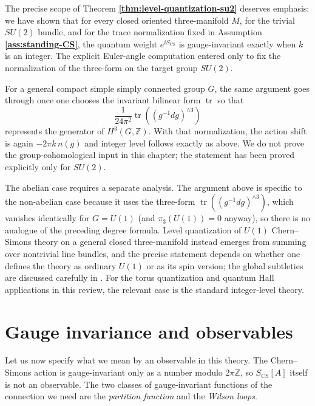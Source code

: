 \documentclass[11pt]{article}
\newcommand{\Z}{\mathbb{Z}}
\newcommand{\tr}{\operatorname{tr}}
\newcommand{\CS}{\operatorname{CS}}
\theoremstyle{definition}
\numberwithin{theorem}{section}
\numberwithin{equation}{section}
\begin{document}
\noindent The precise scope of Theorem \textbf{\ref{thm:level-quantization-su2}} deserves emphasis: we have shown that for every closed oriented three-manifold $M$, for the trivial $SU(2)$ bundle, and for the trace normalization fixed in Assumption \textbf{\ref{ass:standing-CS}}, the quantum weight $e^{iS_{\CS}}$ is gauge-invariant exactly when $k$ is an integer. The explicit Euler-angle computation entered only to fix the normalization of the three-form on the target group $SU(2)$.

\medskip

\noindent For a general compact simple simply connected group $G$, the same argument goes through once one chooses the invariant bilinear form $\tr$ so that
\begin{equation*}
\frac{1}{24\pi^2}\tr\left((g^{-1}dg)^{\wedge 3}\right)
\end{equation*}
represents the generator of $H^3(G,\Z)$. With that normalization, the action shift is again $-2\pi k\, n(g)$ and integer level follows exactly as above. We do not prove the group-cohomological input in this chapter; the statement has been proved explicitly only for $SU(2)$.

\medskip

\noindent The abelian case requires a separate analysis. The argument above is specific to the non-abelian case because it uses the three-form $\tr((g^{-1}dg)^{\wedge 3})$, which vanishes identically for $G=U(1)$ (and $\pi_3(U(1))=0$ anyway), so there is no analogue of the preceding degree formula. Level quantization of $U(1)$ Chern--Simons theory on a general closed three-manifold instead emerges from summing over nontrivial line bundles, and the precise statement depends on whether one defines the theory as ordinary $U(1)$ or as its spin version; the global subtleties are discussed carefully in \cite{SeibergWitten2016Spin}. For the torus quantization and quantum Hall applications in this review, the relevant case is the standard integer-level theory.

\section{Gauge invariance and observables}\label{sec:observables}

Let us now specify what we mean by an observable in this theory. The Chern--Simons action is gauge-invariant only as a number modulo $2\pi \Z$, so $S_{\CS}[A]$ itself is not an observable. The two classes of gauge-invariant functions of the connection we need are the \emph{partition function} and the \emph{Wilson loops}.
\end{document}
